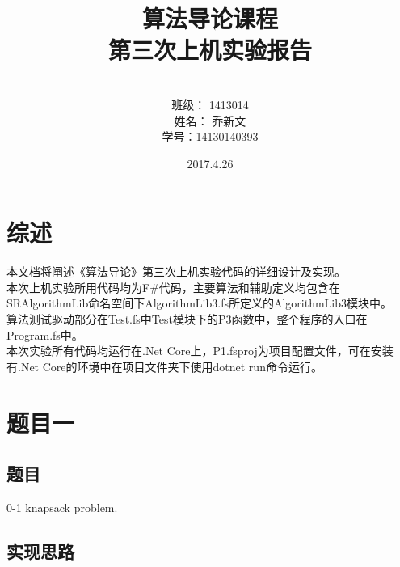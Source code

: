 \documentclass[a4paper]{article}
\begin{document}
\title{\Huge 算法导论课程\\ 第三次上机实验报告}
\author { \vspace{12cm} \\ \LARGE 班级：  1413014  \\ \LARGE 姓名：  乔新文   \\ \LARGE 学号：14130140393} 
\date{ \vspace{4cm} 2017.4.26}

\maketitle
\clearpage

\tableofcontents

\clearpage

\section{综述}

本文档将阐述《算法导论》第三次上机实验代码的详细设计及实现。\\

本次上机实验所用代码均为F\#代码，主要算法和辅助定义均包含在SRAlgorithmLib命名空间下AlgorithmLib3.fs所定义的AlgorithmLib3模块中。\\

算法测试驱动部分在Test.fs中Test模块下的P3函数中，整个程序的入口在Program.fs中。\\

本次实验所有代码均运行在.Net Core上，P1.fsproj为项目配置文件，可在安装有.Net Core的环境中在项目文件夹下使用dotnet run命令运行。\\

\section{题目一}

\subsection{题目}

0-1 knapsack problem.

\subsection{实现思路}
\end{document}
